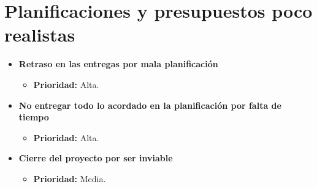 \documentclass[spanish,a4paper,12pt]{report}	%
\begin{document}
\section{Planificaciones y presupuestos poco realistas}
	\begin{itemize}
		\item \textbf{Retraso en las entregas por mala planificación}%
			\begin{itemize}
				\item \textbf{Prioridad: }Alta.
			\end{itemize}
		
		\item \textbf{No entregar todo lo acordado en la planificación por falta de tiempo}%
			\begin{itemize}
				\item \textbf{Prioridad: }Alta.
			\end{itemize}
		
		\item \textbf{Cierre del proyecto por ser inviable}
			\begin{itemize}
				\item \textbf{Prioridad: }Media.
			\end{itemize}
	\end{itemize}
%
\end{document}
